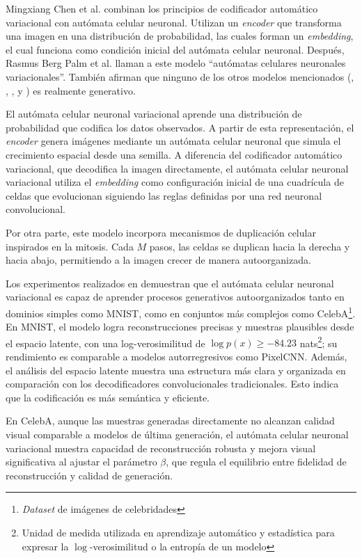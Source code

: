 Mingxiang Chen et al. \cite{VAENCA} combinan los principios de codificador automático variacional con autómata celular neuronal. Utilizan un \textit{encoder} que transforma una imagen en una distribución de probabilidad, las cuales forman un \textit{embedding}, el cual funciona como condición inicial del autómata celular neuronal. Después, Rasmus Berg Palm et al. \cite{VNCA} llaman a este modelo ``autómatas celulares neuronales variacionales''. También afirman que ninguno de los otros modelos mencionados (\cite{mordvintsevNCA}, \cite{NCAM}, \cite{GCA}, \cite{horibe} y \cite{StampCA}) es realmente generativo.

El autómata celular neuronal variacional aprende una distribución de probabilidad que codifica los datos observados. A partir de esta representación, el \textit{encoder} genera imágenes mediante un autómata celular neuronal que simula el crecimiento espacial desde una semilla. A diferencia del codificador automático variacional, que decodifica la imagen directamente, el autómata celular neuronal variacional utiliza el \textit{embedding} como configuración inicial de una cuadrícula de celdas que evolucionan siguiendo las reglas definidas por una red neuronal convolucional. 

Por otra parte, este modelo incorpora mecanismos de duplicación celular inspirados en la mitosis. Cada $M$ pasos, las celdas se duplican hacia la derecha y hacia abajo, permitiendo a la imagen crecer de manera autoorganizada. 

Los experimentos realizados en \cite{VNCA} demuestran que el autómata celular neuronal variacional es capaz de aprender procesos generativos autoorganizados tanto en dominios simples como MNIST, como en conjuntos más complejos como CelebA\footnote{\textit{Dataset} de imágenes de celebridades}. En MNIST, el modelo logra reconstrucciones precisas y muestras plausibles desde el espacio latente, con una log-verosimilitud de $\log p(x) \geq -84.23$ nats\footnote{Unidad de medida utilizada en aprendizaje automático y estadística para expresar la $\log$-verosimilitud o la entropía de un modelo}; su rendimiento es comparable a modelos autorregresivos como PixelCNN. Además, el análisis del espacio latente muestra una estructura más clara y organizada en comparación con los decodificadores convolucionales tradicionales. Esto indica que la codificación es más semántica y eficiente.

En CelebA, aunque las muestras generadas directamente no alcanzan calidad visual comparable a modelos de última generación, el autómata celular neuronal variacional muestra capacidad de reconstrucción robusta y mejora visual significativa al ajustar el parámetro $\beta$, que regula el equilibrio entre fidelidad de reconstrucción y calidad de generación. 

